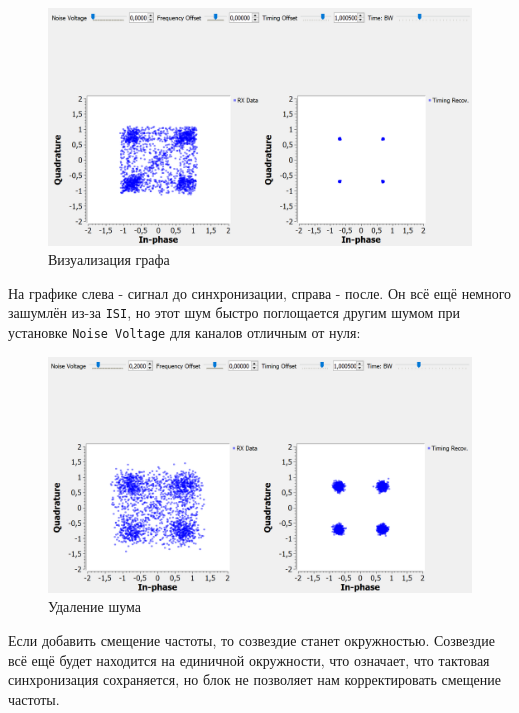 \documentclass[a4paper,12pt]{report}
\begin{document}
\begin{figure}[H]
        \centering
        \includegraphics[width=1.0\textwidth]{lab12_fig3_11.png}
        \caption{Визуализация графа}
        \label{fig:lab12_fig3_11}
\end{figure}

На графике слева - сигнал до синхронизации, справа - после. Он всё ещё немного зашумлён из-за \texttt{ISI}, но этот шум быстро поглощается другим шумом при установке \texttt{Noise Voltage} для каналов отличным от нуля:

\begin{figure}[H]
        \centering
        \includegraphics[width=1.0\textwidth]{lab12_fig3_12.png}
        \caption{Удаление шума}
        \label{fig:lab12_fig3_12}
\end{figure}

Если добавить смещение частоты, то созвездие станет окружностью. Созвездие всё ещё будет находится на единичной окружности, что означает, что тактовая синхронизация сохраняется, но блок не позволяет нам корректировать смещение частоты.
\end{document}
